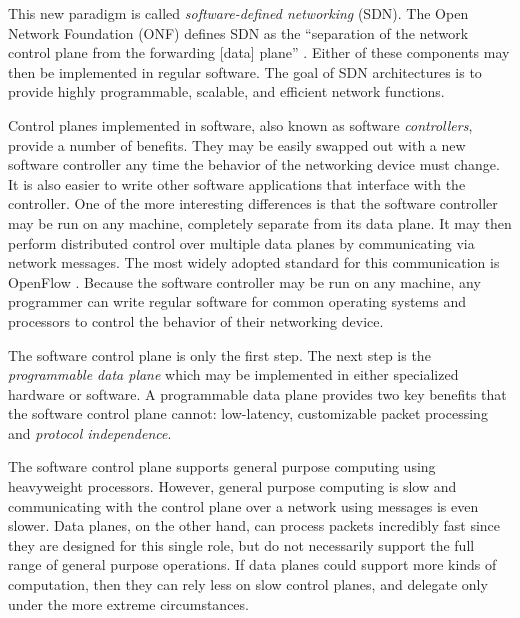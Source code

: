 This new paradigm
is called \textit{software-defined networking} (SDN). The Open Network
Foundation (ONF) defines SDN as the ``separation of the network control
plane from the forwarding [data] plane'' \cite{onf_sdn_def}.
Either of these components may then be implemented in regular software.
The goal of SDN architectures is to provide highly programmable, scalable, and 
efficient network functions.

Control planes implemented in software, also known as software \emph{controllers},  provide a number of benefits.
They may be easily swapped out with a new software controller any time 
the behavior of the networking device must change.
It is also easier to write other software applications that interface with the controller.
One of the more interesting differences is that
the software controller may be run on any machine, completely separate from its data plane.
It may then perform distributed control over multiple data planes by communicating via network messages.
The most widely adopted standard for this communication is OpenFlow
\cite{openflow_spec}.
Because the software controller may be run on any machine,
any programmer can write regular software for common operating
systems and processors to control the behavior of their networking device.

The software control plane is only the first step. The next
step is the \emph{programmable data plane} which may be implemented
in either specialized hardware or software. 
A programmable data plane provides
two key benefits that the software control plane cannot: low-latency,
customizable packet processing and \emph{protocol independence}.


The software control plane supports general purpose computing using heavyweight
processors. However, general purpose computing is slow and communicating
with the control plane over a network using messages is even slower.
Data planes, on the other hand, can process packets incredibly fast since
they are designed for this single role, but do not necessarily support
the full range of general purpose operations.
If data planes could support more kinds of computation, then they can rely less
on
slow control planes, and delegate only under the more extreme circumstances.

